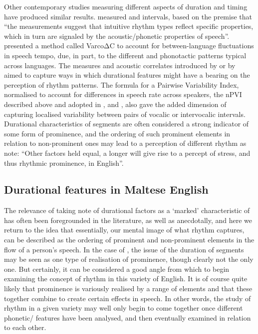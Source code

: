 \documentclass[output=paper]{langsci/langscibook}
\begin{document}
Other contemporary studies measuring different aspects of duration and
timing have produced similar results. 
\citet[265]{Ramusetal1999} measured  and  intervals, based
on the premise that “the measurements suggest that intuitive rhythm
types reflect specific  properties, which in turn are
signaled by the acoustic/phonetic properties of
speech”. \citet{Dellwo2006} presented a method called VarcoΔC
to account for between-language fluctuations in speech tempo, due, in
part, to the different  and phonotactic patterns
typical across languages. The measures and acoustic correlates
introduced by \citet{Ramusetal1999} or by \citet{Dellwo2006} aimed to
capture ways in which durational features might have a bearing on the
perception of rhythm patterns. The formula for a Pairwise Variability
Index, normalised to account for differences in speech rate across
speakers, the nPVI described above and adopted in 
\citet{GrabeLow2002}, and \citet{Lowetal2000}, also gave the
added dimension of capturing localised variability between pairs of
vocalic or intervocalic intervals. Durational characteristics of
segments are often considered a strong indicator of some form of
prominence, and the ordering of such prominent elements in relation to
non-prominent ones may lead to a perception of different rhythm as \citet[4]{NokesHay2012} note: “Other factors held equal, a longer
 will give rise to a percept of  stress, and thus
rhythmic prominence, in English”.

\subsection{Durational features in Maltese English}
The relevance of taking note of durational factors as a ‘marked’ characteristic of  has often been foregrounded in the literature, as well as anecdotally, and here we return to the idea that essentially, our mental image of what rhythm captures, can be described as the ordering of prominent and non-prominent elements in the flow of a person's speech. In the case of , the issue of the duration of segments may be seen as one type of realisation of prominence, though clearly not the only one. But certainly, it can be considered a good angle from which to begin examining the concept of rhythm in this variety of English. It is of course quite likely that prominence is variously realised by a range of elements and that these together combine to create certain effects in speech. In other words, the study of rhythm in a given variety may well only begin to come together once different phonetic/ features have been analysed, and then eventually examined in relation to each other. 
\end{document}
